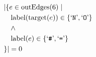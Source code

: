 \begin{align*}
&|\{e \in \mathrm{outEdges}(6)  \mid \\
&\quad \mathrm{label}(\mathrm{target}(e)) \in \{ \text{`\texttt{N}'},  \text{`\texttt{O}'} \}\\
&\quad \wedge\\
&\quad \mathrm{label}(e) \in \{ \text{`\texttt{\#}'},  \text{`\texttt{=}'} \}\\
&\}| = 0
\end{align*}

